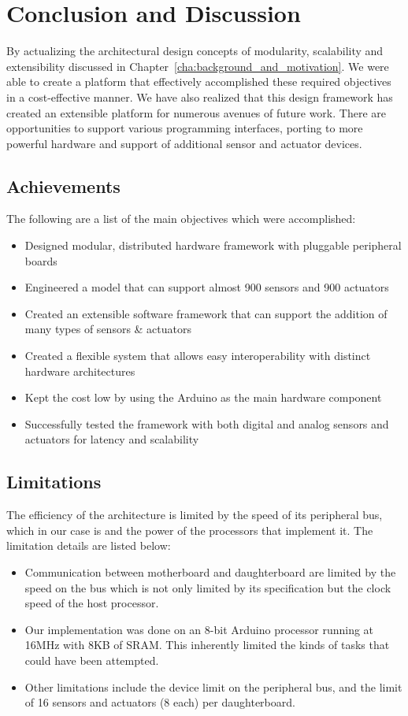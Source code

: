\chapter{Conclusion and Discussion} 
By actualizing the architectural design concepts of modularity, scalability and extensibility discussed in Chapter~\ref{cha:background_and_motivation}. We were able to create a platform that effectively accomplished these required objectives in a cost-effective manner. We have also realized that this design framework has created an extensible platform for numerous avenues of future work. There are opportunities to support various programming interfaces, porting \xten to more powerful hardware and support of additional sensor and actuator devices.

\section{Achievements}
The following are a list of the main objectives which were accomplished:
\begin{itemize}
\item Designed modular, distributed hardware framework with pluggable peripheral boards
\item Engineered a model that can support almost 900 sensors and 900 actuators
\item Created an extensible software framework that can support the addition of many types of sensors \& actuators
\item Created a flexible system that allows easy interoperability with distinct hardware architectures
\item Kept the cost low by using the Arduino as the main hardware component
\item Successfully tested the framework with both digital and analog sensors and actuators for latency and scalability
\end{itemize}

\section{Limitations}
The efficiency of the \xten architecture is limited by the speed of its peripheral bus, which in our case is \iic and the power of the processors that implement it.
The limitation details are listed below:
\begin{itemize}
\item Communication between motherboard and daughterboard are limited by the speed on the \iic bus which is not only limited by its specification but the clock speed of the host processor.
\item Our implementation was done on an 8-bit Arduino processor running at 16MHz with 8KB of SRAM. This inherently limited the kinds of tasks that could have been attempted.
\item Other limitations include the  device limit on the peripheral bus, and the limit of 16 sensors and actuators (8 each) per daughterboard.
\end{itemize}

